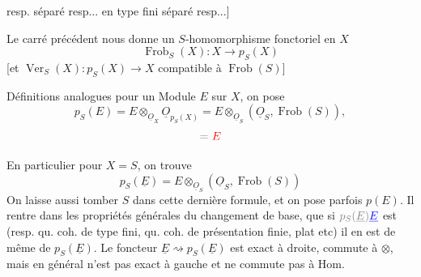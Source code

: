 resp. séparé resp... en type fini  séparé resp...]

Le carré précédent nous donne un $S$-homomorphisme
fonctoriel en $X$
\[
\operatorname{Frob}_S(X):X\longrightarrow p_S(X)
\]
[et $\operatorname{Ver}_S(X):p_S(X)\longrightarrow X$
compatible à $\operatorname{Frob}(S)$]

Définitions analogues pour un Module $E$
sur $X$, on pose
\[
p_S(E)=E\otimes_{\underline O_X}\underline O_{p_S(X)}
=E\otimes_{\underline O_S}(\underline O_S,\operatorname{Frob}(S)),
\]
\[
\deleted{=\unsure{E}}
\]

En particulier pour $X=S$, on trouve
\[
p_S(\underline E)=E\otimes_{\underline O_S}(\underline O_S,\operatorname{Frob}(S))
\]
On laisse aussi tomber $S$ dans cette dernière formule, et on pose parfois
$p(E)$.
Il rentre dans les propriétés générales du changement de base, que si
$\deleted{p_S(\underline E)}\inserted{\underline E}$ est
 (resp.  qu. coh. de type fini,
qu. coh. de présentation finie, plat etc) il en est de même de
 $p_S(\underline E)$.
Le foncteur $\underline E\rightsquigarrow p_S(\underline E)$ est exact à droite, commute
à $\otimes$, mais en général n'est pas exact à gauche et ne commute pas à Hom.

